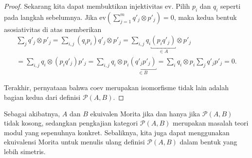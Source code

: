 \begin{proof}
	Sekarang kita dapat membuktikan injektivitas $\mathrm{ev}$. Pilih $p_i$
	dan $q_i$ seperti pada langkah sebelumnya. Jika
	$\mathrm{ev}(\sum_{j=1}^m q'_j\otimes p'_j)=0$, maka kedua bentuk
	asosiativitas di atas memberikan
	\begin{multline*}
		\sum_j q'_j \otimes p'_j
		= \sum_{i,j}(q_i p_i)q'_j\otimes p'_j
		= \sum_{i,j}q_i\underbracket{(p_iq'_j)}_{\in A}\otimes p'_j \\
		= \sum_{i,j}q_i\otimes(p_iq'_j)p'_j
		= \sum_{i,j}q_i\otimes p_i\underbracket{(q'_jp'_j)}_{\in B}
		= \sum_i q_i\otimes p_i\sum_j q'_jp'_j=0.
	\end{multline*}

	Terakhir, pernyataan bahwa $\mathrm{coev}$ merupakan isomorfisme tidak
	lain adalah bagian kedua dari definisi $\mathcal{P}(A,B)$.
\end{proof}

Sebagai akibatnya, $A$ dan $B$ ekuivalen Morita jika dan hanya jika
$\mathcal{P}(A,B)$ tidak kosong, sedangkan pengkajian kategori
$\mathcal{P}(A,B)$ merupakan masalah teori modul yang sepenuhnya konkret.
Sebaliknya, kita juga dapat menggunakan ekuivalensi Morita untuk menulis
ulang definisi $\mathcal{P}(A,B)$ dalam bentuk yang lebih simetris.

